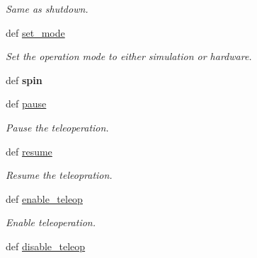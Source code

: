 \begin{DoxyCompactItemize}
\begin{DoxyCompactList}\small\item\em Same as shutdown. \end{DoxyCompactList}\item 
def \hyperlink{classcamera__control__node_1_1Teleop__class_a611b6acc2e845d0269b2194ae1c52457}{set\-\_\-mode}
\begin{DoxyCompactList}\small\item\em Set the operation mode to either simulation or hardware. \end{DoxyCompactList}\item 
\hypertarget{classcamera__control__node_1_1Teleop__class_abbb8d5b8c8dfbc2736fb3e1cb28d54f6}{def {\bfseries spin}}\label{classcamera__control__node_1_1Teleop__class_abbb8d5b8c8dfbc2736fb3e1cb28d54f6}

\item 
\hypertarget{classcamera__control__node_1_1Teleop__class_a4ad0f95701d0951b3f758613f5fdc3c5}{def \hyperlink{classcamera__control__node_1_1Teleop__class_a4ad0f95701d0951b3f758613f5fdc3c5}{pause}}\label{classcamera__control__node_1_1Teleop__class_a4ad0f95701d0951b3f758613f5fdc3c5}

\begin{DoxyCompactList}\small\item\em Pause the teleoperation. \end{DoxyCompactList}\item 
\hypertarget{classcamera__control__node_1_1Teleop__class_a55a643e5dfb067fd86426c9aea1a8ec3}{def \hyperlink{classcamera__control__node_1_1Teleop__class_a55a643e5dfb067fd86426c9aea1a8ec3}{resume}}\label{classcamera__control__node_1_1Teleop__class_a55a643e5dfb067fd86426c9aea1a8ec3}

\begin{DoxyCompactList}\small\item\em Resume the teleopration. \end{DoxyCompactList}\item 
\hypertarget{classcamera__control__node_1_1Teleop__class_a4f6e515dab9822f8513ad23da7be7b36}{def \hyperlink{classcamera__control__node_1_1Teleop__class_a4f6e515dab9822f8513ad23da7be7b36}{enable\-\_\-teleop}}\label{classcamera__control__node_1_1Teleop__class_a4f6e515dab9822f8513ad23da7be7b36}

\begin{DoxyCompactList}\small\item\em Enable teleoperation. \end{DoxyCompactList}\item 
\hypertarget{classcamera__control__node_1_1Teleop__class_a0cd67e1acfe8351955a64b0b64db1e4c}{def \hyperlink{classcamera__control__node_1_1Teleop__class_a0cd67e1acfe8351955a64b0b64db1e4c}{disable\-\_\-teleop}}\label{classcamera__control__node_1_1Teleop__class_a0cd67e1acfe8351955a64b0b64db1e4c}


\end{DoxyCompactItemize}
